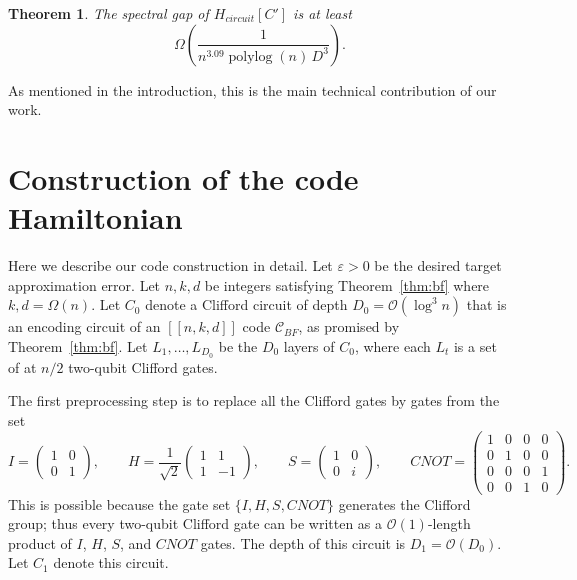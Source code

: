 \documentclass[11pt,letterpaper]{article}
\newtheorem{theorem}{Theorem}[section]
\theoremstyle{definition}
\theoremstyle{remark}
\DeclareMathOperator{\polylog}{polylog}
\newcommand{\cC}{\mathcal C}
\let\epsilon=\varepsilon
\numberwithin{equation}{section}
\newcommand{\eps}{\epsilon}
\theoremstyle{definition}
\begin{document}
\begin{theorem}
  The spectral gap of $H_{circuit}[C']$ is at least 
  \begin{equation}
    \Omega \left (\frac{1}{n^{3.09} \polylog(n)\, D^3} \right).
  \end{equation}
\end{theorem}
\noindent As mentioned in the introduction, this is the main technical contribution of our work.
\fi


%
\section{Construction of the code Hamiltonian}
\label{sec:construction}

Here we describe our code construction in detail. Let $\eps > 0$ be the desired target approximation error. Let $n,k,d$ be integers satisfying Theorem~\ref{thm:bf} where $k,d = \Omega(n)$. Let $C_0$ denote a Clifford circuit of depth $D_0 = \mathcal{O}(\log^3 n)$ that is an encoding circuit of an $[[n,k,d]]$ code $\cC_{BF}$, as promised by Theorem~\ref{thm:bf}. Let $L_1,\ldots,L_{D_0}$ be the $D_0$ layers of $C_0$, where each $L_t$ is a set of at $n/2$ two-qubit Clifford gates. 

The first preprocessing step is to replace all the Clifford gates by gates from the set
\begin{equation}
  I = \begin{pmatrix} 1 & 0 \\ 0 & 1 \end{pmatrix}, \qquad H = \frac{1}{\sqrt{2}} \begin{pmatrix} 1 & 1 \\ 1 & -1 \end{pmatrix}, \qquad S = \begin{pmatrix} 1 & 0 \\ 0 & i \end{pmatrix}, \qquad CNOT = \begin{pmatrix} 1 & 0 & 0 & 0 \\ 0 & 1 & 0 & 0 \\ 0 & 0 & 0 & 1 \\ 0 & 0 & 1 & 0\end{pmatrix}.
\end{equation}
This is possible because the gate set $\{ I, H, S, CNOT \}$ generates the Clifford group; thus every two-qubit Clifford gate can be written as a $\mathcal{O}(1)$-length product of $I$, $H$, $S$, and $CNOT$ gates. The depth of this circuit is $D_1 = \mathcal{O}(D_0)$. Let $C_1$ denote this circuit.
\end{document}
